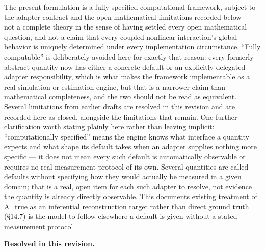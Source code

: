 \documentclass[
]{article}
\begin{document}
The present formulation is a fully specified computational framework,
subject to the adapter contract and the open mathematical limitations
recorded below --- not a complete theory in the sense of having settled
every open mathematical question, and not a claim that every coupled
nonlinear interaction's global behavior is uniquely determined under
every implementation circumstance. ``Fully computable'' is deliberately
avoided here for exactly that reason: every formerly abstract quantity
now has either a concrete default or an explicitly delegated adapter
responsibility, which is what makes the framework implementable as a
real simulation or estimation engine, but that is a narrower claim than
mathematical completeness, and the two should not be read as equivalent.
Several limitations from earlier drafts are resolved in this revision
and are recorded here as closed, alongside the limitations that remain.
One further clarification worth stating plainly here rather than leaving
implicit: ``computationally specified'' means the engine knows what
interface a quantity expects and what shape its default takes when an
adapter supplies nothing more specific --- it does not mean every such
default is automatically observable or requires no real measurement
protocol of its own. Several quantities are called defaults without
specifying how they would actually be measured in a given domain; that
is a real, open item for each such adapter to resolve, not evidence the
quantity is already directly observable. This documents existing
treatment of A\_true as an inferential reconstruction target rather than
direct ground truth (§14.7) is the model to follow elsewhere a default
is given without a stated measurement protocol.

\textbf{Resolved in this revision.}
\end{document}
